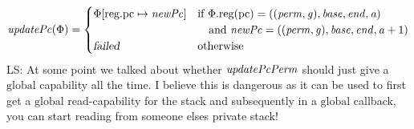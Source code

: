 \documentclass[a4paper]{article}
\newcommand{\update}[2]{[#1 \mapsto #2]}
\newcommand\lau[1]{{\color{purple} \sf \footnotesize {LS: #1}}\\}
\newcommand{\var}[1]{\mathit{#1}}
\newcommand{\gl}{\var{g}}
\newcommand{\pcreg}{\mathrm{pc}}
\newcommand{\addr}{\var{a}}
\newcommand{\start}{\var{base}}
\newcommand{\addrend}{\var{end}}
\newcommand{\perm}{\var{perm}}
\newcommand{\stdcap}[1][(\perm,\gl)]{\left(#1,\start,\addrend,\addr \right)}
\newcommand{\plainproj}[1]{\mathrm{#1}}
\newcommand{\memreg}[1][\Phi]{#1.\plainproj{reg}}
\newcommand{\updateReg}[3][\Phi]{#1\update{\plainproj{reg}.#2}{#3}}
\newcommand{\failed}{\textsl{failed}}
\newcommand{\plainfun}[2]{
  \ifthenelse{\equal{#2}{}}
  {\mathit{#1}}
  {\mathit{#1}(#2)}
}
\newcommand{\updatePcPerm}[1]{\plainfun{updatePcPerm}{#1}}
\newcommand{\stdUpdatePc}[1]{\plainfun{updatePc}{#1}}
\newcommand{\plainperm}[1]{\mathrm{#1}}
\newcommand{\glob}{\plainperm{global}}
\begin{document}
\begin{align*}
  \stdUpdatePc{\Phi} &=
                       \begin{cases}
                         \updateReg{\pcreg}{\var{newPc}} & 
                         \arraycolsep=0pt
                         \begin{array}[t]{l}
                           \text{if $\memreg(\pcreg) = \stdcap$}\\
                           \quad\text{and $\var{newPc} = ((\perm,\gl),\start,\addrend,\addr + 1)$}\\
                         \end{array} \\
                         \failed & \text{otherwise}
                       \end{cases} \\
\end{align*}
\lau{At some point we talked about whether $\updatePcPerm{}$ should just give a $\glob$ capability all the time. I believe this is dangerous as it can be used to first get a $\glob$ read-capability for the stack and subsequently in a $\glob$ callback, you can start reading from someone elses private stack!}
\end{document}
